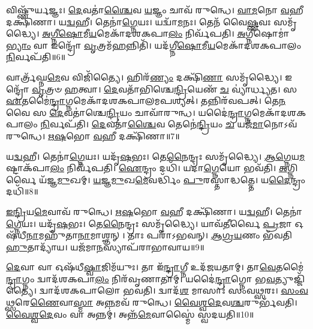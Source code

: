 𑌵𑌿𑌷𑍍𑌣𑍁᳴𑌰𑍍\mbox{}\-\ul{𑌯}\-𑌜𑍍𑌞𑌃।
\-\ul{𑌦𑍇}\-𑌵𑌤𑌾॑\-\ul{𑌶𑍍𑌚𑍈}\-𑌵 \ul{𑌯}\-𑌜𑍍𑌞𑌂 𑌚𑌾𑌵᳴ 𑌰𑍁𑌨𑍍𑌧𑍇।
\-\ul{𑌵𑌾}\-\-\ul{𑌮}\-𑌨𑍋 \ul{𑌵}\-𑌹𑍀 𑌦𑌕𑍍𑌷𑌿᳴𑌣𑌾।
𑌯\-\ul{𑌦𑍍𑌵}\-𑌹𑍀।
𑌤𑍇𑌨𑌾॑\-\ul{𑌗𑍍𑌨𑍇}\-𑌯𑌃।
𑌯𑌦𑍍𑌵𑌾᳴\-\ul{𑌮}\-𑌨𑌃।
𑌤𑍇𑌨᳴ 𑌵𑍈\-\ul{𑌷𑍍𑌣}\-𑌵𑌃 𑌸𑌮𑍃᳴𑌦𑍍𑌧𑍍𑌯𑍈।
\-\ul{𑌅}\-\-\ul{𑌗𑍍𑌨𑍀}\-\-\ul{𑌷𑍋}\-𑌮𑍀\-\ul{𑌯}\-𑌮𑍇𑌕𑌾᳴\-𑌦𑌶\-𑌕𑌪𑌾\-\ul{𑌲𑌂} 𑌨𑌿𑌰𑍍𑌵᳴𑌪𑌤𑌿।
\-\ul{𑌅}\-𑌗𑍍𑌨𑍀𑌷𑍋𑌮𑌾॑\-\ul{𑌭𑍍𑌯𑌾𑌂} 𑌵𑌾 𑌇𑌨𑍍𑌦𑍍𑌰𑍋᳴ \ul{𑌵𑍃}\-𑌤𑍍𑌰𑌮᳴\-\ul{𑌹}\-𑌨𑍍𑌨𑌿𑌤𑌿᳴।
𑌯𑌦᳴𑌗𑍍𑌨𑍀\-\ul{𑌷𑍋}\-𑌮𑍀\-\ul{𑌯}\-𑌮𑍇𑌕𑌾᳴\-𑌦𑌶\-𑌕𑌪𑌾𑌲𑌂 \ul{𑌨𑌿}\-𑌰𑍍𑌵𑌪᳴𑌤𑌿॥6॥

𑌵𑌾𑌰𑍍𑌤𑍍𑌰᳴𑌘𑍍𑌨\-\ul{𑌮𑍇}\-𑌵 𑌵𑌿𑌜𑌿᳴𑌤𑍍𑌯𑍈।
𑌹𑌿𑌰᳴\-\ul{𑌣𑍍𑌯𑌂} 𑌦𑌕𑍍𑌷𑌿᳴\-\ul{𑌣𑌾} 𑌸𑌮𑍃᳴𑌦𑍍𑌧𑍍𑌯𑍈।
𑌇𑌨𑍍𑌦𑍍𑌰𑍋᳴ \ul{𑌵𑍃}\-𑌤𑍍𑌰𑍞 \ul{𑌹}\-𑌤𑍍𑌵𑌾।
\-\ul{𑌦𑍇}\-𑌵𑌤𑌾᳴𑌭𑌿𑌶𑍍𑌚𑍇\-\ul{𑌨𑍍𑌦𑍍𑌰𑌿}\-𑌯𑍇𑌣᳴ \ul{𑌚} 𑌵𑍍𑌯𑌾॑𑌰𑍍𑌧𑍍𑌯𑌤।
𑌸 \ul{𑌏}\-𑌤𑌮𑍈॑\-\ul{𑌨𑍍𑌦𑍍𑌰𑌾}\-𑌗𑍍𑌨𑌮𑍇𑌕𑌾᳴\-𑌦𑌶\-𑌕𑌪𑌾𑌲𑌮𑌪𑌶𑍍𑌯𑌤𑍍।
𑌤𑌨𑍍𑌨𑌿𑌰᳴𑌵𑌪𑌤𑍍।
𑌤𑍇\-\ul{𑌨} 𑌵𑍈 𑌸 \ul{𑌦𑍇}\-𑌵𑌤𑌾॑𑌶𑍍𑌚𑍇\-\ul{𑌨𑍍𑌦𑍍𑌰𑌿}\-𑌯𑌂 𑌚𑌾𑌵𑌾᳴𑌰𑍁𑌨𑍍𑌧।
𑌯𑌦𑍈॑\-\ul{𑌨𑍍𑌦𑍍𑌰𑌾}\-𑌗𑍍𑌨𑌮𑍇𑌕𑌾᳴\-𑌦𑌶\-𑌕𑌪𑌾𑌲𑌂 \ul{𑌨𑌿}\-𑌰𑍍𑌵𑌪᳴𑌤𑌿।
\-\ul{𑌦𑍇}\-𑌵𑌤𑌾॑\-\ul{𑌶𑍍𑌚𑍈}\-𑌵 𑌤𑍇𑌨𑍇॑\-\ul{𑌨𑍍𑌦𑍍𑌰𑌿}\-𑌯𑌂 \ul{𑌚} 𑌯𑌜᳴\-\ul{𑌮𑌾}\-𑌨𑍋\-𑌽𑌵᳴ 𑌰𑍁𑌨𑍍𑌧𑍇।
\-\ul{𑌋}\-\-\ul{𑌷}\-𑌭𑍋 \ul{𑌵}\-𑌹𑍀 𑌦𑌕𑍍𑌷𑌿᳴𑌣𑌾॥7॥

𑌯\-\ul{𑌦𑍍𑌵}\-𑌹𑍀।
𑌤𑍇𑌨𑌾॑\-\ul{𑌗𑍍𑌨𑍇}\-𑌯𑌃।
𑌯𑌦𑍃᳴\-\ul{𑌷}\-𑌭𑌃।
𑌤𑍇\-\ul{𑌨𑍈}\-𑌨𑍍𑌦𑍍𑌰𑌃 𑌸𑌮𑍃᳴𑌦𑍍𑌧𑍍𑌯𑍈।
\-\ul{𑌆}\-\-\ul{𑌗𑍍𑌨𑍇}\-𑌯\-\ul{𑌮}\-𑌷𑍍𑌟𑌾\-𑌕᳴𑌪𑌾\-\ul{𑌲𑌂} 𑌨𑌿𑌰𑍍𑌵᳴𑌪𑌤𑌿।
\-\ul{𑌐}\-𑌨𑍍𑌦𑍍𑌰𑌂 𑌦𑌧𑌿᳴।
𑌯𑌦𑌾॑\-\ul{𑌗𑍍𑌨𑍇}\-𑌯𑍋 𑌭𑌵᳴𑌤𑌿।
\-\ul{𑌅}\-𑌗𑍍𑌨𑌿𑌰𑍍𑌵𑍈 𑌯᳴𑌜𑍍𑌞\-\ul{𑌮𑍁}\-𑌖𑌮𑍍।
\-\ul{𑌯}\-\-\ul{𑌜𑍍𑌞}\-\-\ul{𑌮𑍁}\-𑌖\-\ul{𑌮𑍇}\-𑌵𑌰𑍍𑌦𑍍𑌧𑌿𑌂᳴ \ul{𑌪𑍁}\-𑌰𑌸𑍍𑌤𑌾॑𑌦𑍍𑌧𑌤𑍍𑌤𑍇।
𑌯\-\ul{𑌦𑍈}\-𑌨𑍍𑌦𑍍𑌰𑌂 𑌦𑌧𑌿᳴॥8॥

\-\ul{𑌇}\-\-\ul{𑌨𑍍𑌦𑍍𑌰𑌿}\-𑌯\-\ul{𑌮𑍇}\-𑌵𑌾𑌵᳴ 𑌰𑍁𑌨𑍍𑌧𑍇।
\-\ul{𑌋}\-\-\ul{𑌷}\-𑌭𑍋 \ul{𑌵}\-𑌹𑍀 𑌦𑌕𑍍𑌷𑌿᳴𑌣𑌾।
𑌯\-\ul{𑌦𑍍𑌵}\-𑌹𑍀।
𑌤𑍇𑌨𑌾॑\-\ul{𑌗𑍍𑌨𑍇}\-𑌯𑌃।
𑌯𑌦𑍃᳴\-\ul{𑌷}\-𑌭𑌃।
𑌤𑍇\-\ul{𑌨𑍈}\-𑌨𑍍𑌦𑍍𑌰𑌃 𑌸𑌮𑍃᳴𑌦𑍍𑌧𑍍𑌯𑍈।
𑌯𑌾𑌵᳴\-\ul{𑌤𑍀}\-𑌰𑍍𑌵𑍈 \ul{𑌪𑍍𑌰}\-𑌜𑌾 𑌓𑌷᳴𑌧𑍀\-\ul{𑌨𑌾}\-𑌮𑌹𑍁᳴𑌤𑌾\-\ul{𑌨𑌾}\-𑌮𑌾𑌶𑍍𑌞𑌨𑍍।
𑌤𑌾𑌃 𑌪𑌰𑌾᳴\-𑌽𑌭𑌵𑌨𑍍।
\-\ul{𑌆}\-\-\ul{𑌗𑍍𑌰}\-\-\ul{𑌯}\-𑌣𑌂 𑌭᳴𑌵𑌤𑌿 \ul{𑌹𑍁}\-𑌤𑌾𑌦𑍍𑌯𑌾᳴𑌯।
𑌯𑌜᳴𑌮𑌾\-\ul{𑌨}\-𑌸𑍍𑌯𑌾𑌪᳴𑌰𑌾\-𑌭𑌾𑌵𑌾𑌯॥9॥

\-\ul{𑌦𑍇}\-𑌵𑌾 𑌵𑌾 𑌓𑌷᳴𑌧𑍀\-\ul{𑌷𑍍𑌵𑌾}\-𑌜𑌿𑌮᳴𑌯𑍁𑌃।
𑌤𑌾 𑌇᳴\-\ul{𑌨𑍍𑌦𑍍𑌰𑌾}\-𑌗𑍍𑌨𑍀 𑌉𑌦᳴𑌜𑌯𑌤𑌾𑌮𑍍।
𑌤𑌾\-\ul{𑌵𑍇}\-𑌤𑌮𑍈॑\-\ul{𑌨𑍍𑌦𑍍𑌰𑌾}\-𑌗𑍍𑌨𑌂 𑌦𑍍𑌵𑌾𑌦᳴𑌶𑌕𑌪𑌾\-\ul{𑌲𑌂} 𑌨𑌿𑌰᳴𑌵𑍃𑌣𑌾𑌤𑌾𑌮𑍍।
𑌯𑌦𑍈॑\-\ul{𑌨𑍍𑌦𑍍𑌰𑌾}\-𑌗𑍍𑌨𑍋 𑌭\-\ul{𑌵}\-𑌤𑍍𑌯𑍁𑌜𑍍𑌜𑌿᳴𑌤𑍍𑌯𑍈।
𑌦𑍍𑌵𑌾𑌦᳴𑌶𑌕𑌪𑌾𑌲𑍋 𑌭𑌵𑌤𑌿।
𑌦𑍍𑌵𑌾𑌦᳴\-\ul{𑌶} 𑌮𑌾𑌸𑌾𑌃॑ 𑌸𑌂𑌵\-\ul{𑌥𑍍𑌸}\-𑌰𑌃।
\-\ul{𑌸𑌂}\-\-\ul{𑌵}\-\-\ul{𑌥𑍍𑌸}\-𑌰𑍇\-\ul{𑌣𑍈}\-𑌵𑌾\-\ul{𑌸𑍍𑌮𑌾} 𑌅\-\ul{𑌨𑍍𑌨}\-𑌮𑌵᳴ 𑌰𑍁𑌨𑍍𑌧𑍇।
\-\ul{𑌵𑍈}\-\-\ul{𑌶𑍍𑌵}\-\-\ul{𑌦𑍇}\-𑌵\-\-\ul{𑌶𑍍𑌚}\-𑌰𑍁𑌰𑍍𑌭᳴𑌵𑌤𑌿।
\-\ul{𑌵𑍈}\-\-\ul{𑌶𑍍𑌵}\-\-\ul{𑌦𑍇}\-𑌵𑌂 𑌵𑌾 𑌅𑌨𑍍𑌨𑌮𑍍॑।
𑌅𑌨𑍍𑌨᳴\-\ul{𑌮𑍇}\-𑌵𑌾𑌸𑍍𑌮𑍈॑ 𑌸𑍍𑌵𑌦𑌯𑌤𑌿॥10॥

